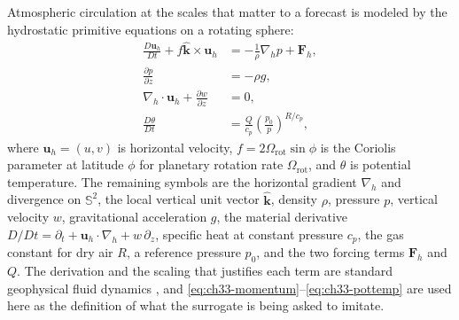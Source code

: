 Atmospheric circulation at the scales that matter to a forecast is modeled by the
hydrostatic primitive equations on a rotating sphere:
\begin{align}
  \label{eq:ch33-momentum}
  \frac{D \mathbf{u}_h}{Dt} + f \hat{\mathbf{k}} \times \mathbf{u}_h &= -\frac{1}{\rho} \nabla_h p + \mathbf{F}_h, \\
  \label{eq:ch33-hydrostatic}
  \frac{\partial p}{\partial z} &= -\rho g, \\
  \label{eq:ch33-continuity}
  \nabla_h \cdot \mathbf{u}_h + \frac{\partial w}{\partial z} &= 0, \\
  \label{eq:ch33-pottemp}
  \frac{D \theta}{Dt} &= \frac{Q}{c_p} \left(\frac{p_0}{p}\right)^{R/c_p},
\end{align}
where $\mathbf{u}_h = (u, v)$ is horizontal velocity, $f = 2\Omega_{\text{rot}} \sin\phi$ is
the Coriolis parameter at latitude $\phi$ for planetary rotation rate $\Omega_{\text{rot}}$,
and $\theta$ is potential temperature. The remaining symbols are the horizontal gradient
$\nabla_h$ and divergence on $\mathbb{S}^2$, the local vertical unit vector
$\hat{\mathbf{k}}$, density $\rho$, pressure $p$, vertical velocity $w$, gravitational
acceleration $g$, the material derivative
$D/Dt = \partial_t + \mathbf{u}_h \cdot \nabla_h + w\,\partial_z$, specific heat at
constant pressure $c_p$, the gas constant for dry air $R$, a reference pressure $p_0$, and
the two forcing terms $\mathbf{F}_h$ and $Q$. The derivation and the scaling that justifies
each term are standard geophysical fluid dynamics \cite{vallis2017atmospheric}, and
\eqref{eq:ch33-momentum}--\eqref{eq:ch33-pottemp} are used here as the definition of what the
surrogate is being asked to imitate. 

